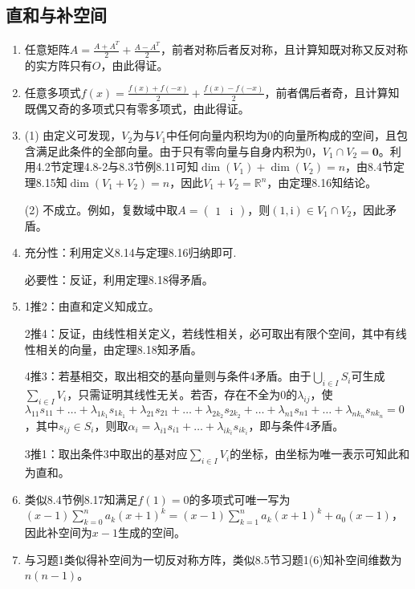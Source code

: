 \documentclass[a4paper,UTF8,fontset=windows]{ctexart}
\begin{document}
\subsection{直和与补空间}
\begin{enumerate}
\item
任意矩阵$A=\frac{A+A^T}{2}+\frac{A-A^T}{2}$，前者对称后者反对称，且计算知既对称又反对称的实方阵只有$O$，由此得证。

\item
任意多项式$f(x)=\frac{f(x)+f(-x)}{2}+\frac{f(x)-f(-x)}{2}$，前者偶后者奇，且计算知既偶又奇的多项式只有零多项式，由此得证。

\item
(1)
由定义可发现，$V_2$为与$V_1$中任何向量内积均为0的向量所构成的空间，且包含满足此条件的全部向量。由于只有零向量与自身内积为0，$V_1\cap V_2=\mathbf{0}$。利用4.2节定理4.8-2与8.3节例8.11可知$\dim(V_1)+\dim(V_2)=n$，由8.4节定理8.15知$\dim(V_1+V_2)=n$，因此$V_1+V_2=\mathbb{R}^n$，由定理8.16知结论。

(2) 不成立。例如，复数域中取$A=\begin{pmatrix}1&\mathrm{i}\end{pmatrix}$，则$(1,\mathrm{i})\in V_1\cap V_2$，因此矛盾。

\item
充分性：利用定义8.14与定理8.16归纳即可.

必要性：反证，利用定理8.18得矛盾。

\item
1推2：由直和定义知成立。

2推4：反证，由线性相关定义，若线性相关，必可取出有限个空间，其中有线性相关的向量，由定理8.18知矛盾。

4推3：若基相交，取出相交的基向量则与条件4矛盾。由于$\bigcup_{i\in I}S_i$可生成$\sum_{i\in I}V_i$，只需证明其线性无关。若否，存在不全为0的$\lambda_{ij}$，使$\lambda_{11}s_{11}+\dots+\lambda_{1k_1}s_{1k_1}+\lambda_{21}s_{21}+\dots+\lambda_{2k_2}s_{2k_2}+\dots+\lambda_{n1}s_{n1}+\dots+\lambda_{nk_n}s_{nk_n}=0$，其中$s_{ij}\in S_i$，则取$\alpha_i=\lambda_{i1}s_{i1}+\dots+\lambda_{ik_i}s_{ik_i}$，即与条件4矛盾。

3推1：取出条件3中取出的基对应$\sum_{i\in I}V_i$的坐标，由坐标为唯一表示可知此和为直和。

\item
类似8.4节例8.17知满足$f(1)=0$的多项式可唯一写为$(x-1)\sum_{k=0}^na_k(x+1)^k=(x-1)\sum_{k=1}^na_k(x+1)^k+a_0(x-1)$，因此补空间为$x-1$生成的空间。

\item
与习题1类似得补空间为一切反对称方阵，类似8.5节习题1(6)知补空间维数为$n(n-1)$。


\end{enumerate}
\end{document}
